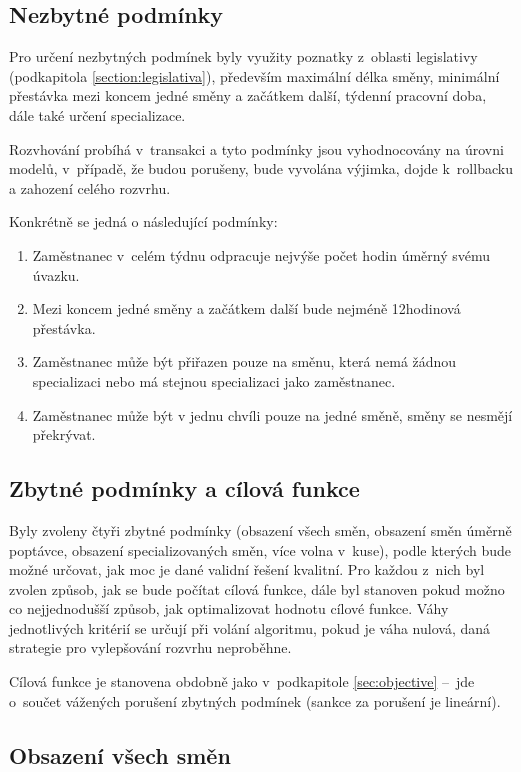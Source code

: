 \documentclass[a4paper,11pt,openany,twoside]{book}
\begin{document}
\subsection{Nezbytné podmínky}
Pro určení nezbytných podmínek byly využity poznatky z~oblasti legislativy (podkapitola \ref{section:legislativa}), především maximální délka směny, minimální přestávka mezi koncem jedné směny a začátkem další, týdenní pracovní doba, dále také určení specializace.

Rozvhování probíhá v~transakci a tyto podmínky jsou vyhodnocovány na úrovni modelů, v~případě, že budou porušeny, bude vyvolána výjimka, dojde k~rollbacku a zahození celého rozvrhu.

Konkrétně se jedná o následující podmínky:

\begin{enumerate}
	\item Zaměstnanec v~celém týdnu odpracuje nejvýše počet hodin úměrný svému úvazku.
	\item Mezi koncem jedné směny a začátkem další bude nejméně 12hodinová přestávka.
	\item Zaměstnanec může být přiřazen pouze na směnu, která nemá žádnou specializaci nebo má stejnou specializaci jako zaměstnanec.
	\item Zaměstnanec může být v jednu chvíli pouze na jedné směně, směny se nesmějí překrývat.
\end{enumerate}

\subsection{Zbytné podmínky a cílová funkce}
Byly zvoleny čtyři zbytné podmínky (obsazení všech směn, obsazení směn úměrně poptávce, obsazení specializovaných směn, více volna v~kuse), podle kterých bude možné určovat, jak moc je dané validní řešení kvalitní. Pro každou z~nich byl zvolen způsob, jak se bude počítat cílová funkce, dále byl stanoven pokud možno co nejjednodušší způsob, jak optimalizovat hodnotu cílové funkce. Váhy jednotlivých kritérií se určují při volání algoritmu, pokud je váha nulová, daná strategie pro vylepšování rozvrhu neproběhne.

Cílová funkce je stanovena obdobně jako v~podkapitole \ref{sec:objective} – jde o~součet vážených porušení zbytných podmínek (sankce za porušení je lineární).

\subsection{Obsazení všech směn}
\end{document}
